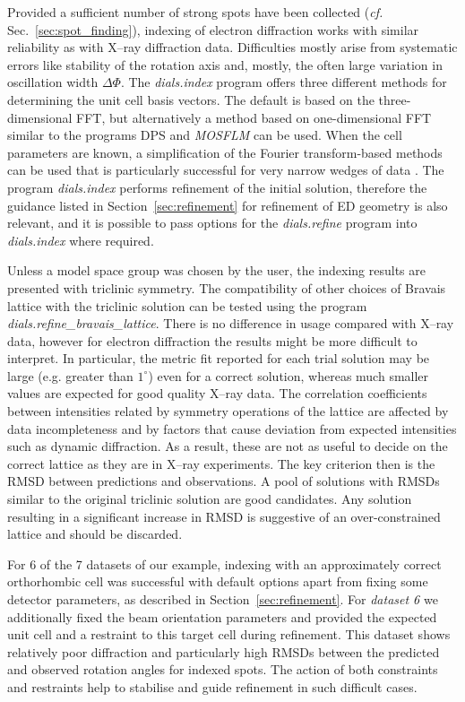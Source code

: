 \documentclass[preprint]{iucr}
\newcommand{\dialsindex}{\emph{dials.index}\xspace}
\newcommand{\dialsrefinebravaislattice}{\emph{dials.refine\_bravais\_lattice}\xspace}
\newcommand{\dialsrefine}{\emph{dials.refine}\xspace}
\newcommand{\mosflm}{\emph{MOSFLM}\xspace}
\begin{document}
Provided a sufficient number of strong spots have been collected (\emph{cf.}
Sec.~\ref{sec:spot_finding}), indexing of electron diffraction works with
similar reliability as with X--ray diffraction data. Difficulties mostly arise
from systematic errors like stability of the rotation axis and, mostly, the
often large variation in oscillation width $\Delta \Phi$.  The \dialsindex
program offers three different methods for determining the unit cell basis
vectors. The default is based on the three-dimensional FFT, but alternatively a
method based on one-dimensional FFT similar to the programs DPS
\cite{Steller1997} and \mosflm \cite{leslie2007} can be used. When the cell
parameters are known, a simplification of the Fourier transform-based methods
can be used that is particularly successful for very narrow wedges of data
\cite{Gildea2014}. The program \dialsindex performs refinement of the initial
solution, therefore the guidance listed in Section~\ref{sec:refinement} for
refinement of ED geometry is also relevant, and it is possible to pass
options for the \dialsrefine program into \dialsindex where required.

Unless a model space group was chosen by the user, the indexing results are
presented with triclinic symmetry. The compatibility of other choices of
Bravais lattice with the triclinic solution can be tested using the program
\dialsrefinebravaislattice \cite{Winter2018,Sauter2006}. There is no difference
in usage compared with X--ray data, however for electron diffraction the
results might be more difficult to interpret. In particular, the metric fit
reported for each trial solution \cite{LePage1982} may be large (e.g. greater
than $1^\circ$) even for a correct solution, whereas much smaller values are
expected for good quality X--ray data. The correlation coefficients between
intensities related by symmetry operations of the lattice are affected by data
incompleteness and by factors that cause deviation from expected intensities
such as dynamic diffraction. As a result, these are not as useful to decide
on the correct lattice as they are in X--ray experiments. The key criterion then
is the RMSD between predictions and observations. A pool of solutions with
RMSDs similar to the original triclinic solution are good candidates. Any
solution resulting in a significant increase in RMSD is suggestive of an
over-constrained lattice and should be discarded.

For 6 of the 7 datasets of our example, indexing with an approximately correct
orthorhombic cell was successful with default options apart from fixing some
detector parameters, as described in Section~\ref{sec:refinement}. For
\emph{dataset 6} we additionally fixed the beam orientation parameters and
provided the expected unit cell and a restraint to this target cell during
refinement. This dataset shows relatively poor diffraction and particularly
high RMSDs between the predicted and observed rotation angles for indexed
spots. The action of both constraints and restraints help to stabilise and
guide refinement in such difficult cases.
\end{document}
